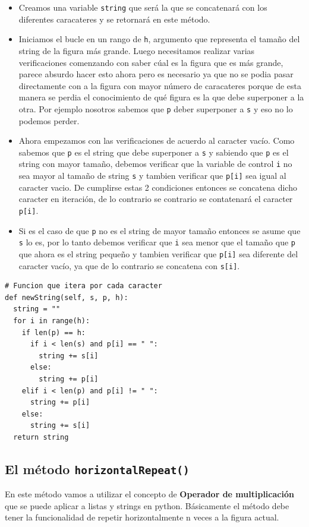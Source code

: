 \documentclass[10pt, a4paper]{article}
\newcommand{\mintpython}[1]{\texttt{#1}}
\begin{document}
\begin{itemize}
  \item Creamos una variable \mintpython{string} que será la que se concatenará con los diferentes caracateres y se retornará en este método.
  \item Iniciamos el bucle en un rango de \mintpython{h}, argumento que representa el tamaño del string de la figura más grande. Luego necesitamos realizar varias verificaciones comenzando con saber cúal es la figura que es más grande, parece absurdo hacer esto ahora pero es necesario ya que no se podia pasar directamente con a la figura con mayor número de caracateres porque de esta manera se perdia el conocimiento de qué figura es la que debe superponer a la otra. Por ejemplo nosotros sabemos que \mintpython{p} deber superponer a \mintpython{s} y eso no lo podemos perder.
  \item Ahora empezamos con las verificaciones de acuerdo al caracter vacío. Como sabemos que \mintpython{p} es el string que debe superponer a \mintpython{s} y sabiendo que \mintpython{p} es el string con mayor tamaño, debemos verificar que la variable de control \mintpython{i} no sea mayor al tamaño de string \mintpython{s} y tambien verificar que \mintpython{p[i]} sea igual al caracter vacio. De cumplirse estas 2 condiciones entonces se concatena dicho caracter en iteración, de lo contrario se contrario se contatenará el caracter \mintpython{p[i]}.

  \item Si es el caso de que \mintpython{p} no es el string de mayor tamaño entonces se asume que \mintpython{s} lo es, por lo tanto debemos verificar que \mintpython{i} sea menor que el tamaño que \mintpython{p} que ahora es el string pequeño y tambien verificar que \mintpython{p[i]} sea diferente del caracter vacío, ya que de lo contrario se concatena con \mintpython{s[i]}.
\end{itemize}

\begin{verbatim}
# Funcion que itera por cada caracter
def newString(self, s, p, h):
  string = ""
  for i in range(h):
    if len(p) == h:
      if i < len(s) and p[i] == " ":
        string += s[i]
      else:
        string += p[i]
    elif i < len(p) and p[i] != " ":
      string += p[i]
    else:
      string += s[i]
  return string
\end{verbatim}

\subsection{El método \mintpython{horizontalRepeat()}}
En este método vamos a utilizar el concepto de \textbf{Operador de multiplicación} que se puede aplicar a listas y strings en python. Básicamente el método debe tener la funcionalidad de repetir horizontalmente n veces a la figura actual.
\end{document}
